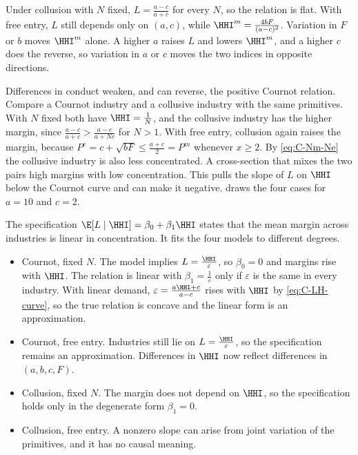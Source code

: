 Under collusion with $N$ fixed, $L = \frac{a - c}{a + c}$ for every $N$, so the relation is flat. With free
entry, $L$ still depends only on $(a, c)$, while $\HHI^m = \frac{4bF}{(a - c)^2}$. Variation in $F$ or $b$
moves $\HHI^m$ alone. A higher $a$ raises $L$ and lowers $\HHI^m$, and a higher $c$ does the reverse, so
variation in $a$ or $c$ moves the two indices in opposite directions.

Differences in conduct weaken, and can reverse, the positive Cournot relation. Compare a Cournot industry and
a collusive industry with the same primitives. With $N$ fixed both have $\HHI = \frac{1}{N}$, and the collusive
industry has the higher margin, since $\frac{a - c}{a + c} > \frac{a - c}{a + Nc}$ for $N > 1$. With free entry,
collusion again raises the margin, because $P^e = c + \sqrt{bF} \le \frac{a + c}{2} = P^m$ whenever $x \ge 2$.
By \eqref{eq:C-Nm-Ne} the collusive industry is also less concentrated. A cross-section that mixes the two
pairs high margins with low concentration. This pulls the slope of $L$ on $\HHI$ below the Cournot curve and
can make it negative.  draws the four cases for $a = 10$ and $c = 2$.

The specification $\E[L \mid \HHI] = \beta_0 + \beta_1\HHI$ states that the mean margin across industries is linear in
concentration. It fits the four models to different degrees.
\begin{itemize}
\item Cournot, fixed $N$. The model implies $L = \frac{\HHI}{\varepsilon}$, so $\beta_0 = 0$ and margins rise
  with $\HHI$. The relation is linear with $\beta_1 = \frac{1}{\varepsilon}$ only if $\varepsilon$ is the same in
  every industry. With linear demand, $\varepsilon = \frac{a\HHI + c}{a - c}$ rises with $\HHI$ by
  \eqref{eq:C-LH-curve}, so the true relation is concave and the linear form is an approximation.
\item Cournot, free entry. Industries still lie on $L = \frac{\HHI}{\varepsilon}$, so the specification remains
  an approximation. Differences in $\HHI$ now reflect differences in $(a, b, c, F)$.
\item Collusion, fixed $N$. The margin does not depend on $\HHI$, so the specification holds only in the
  degenerate form $\beta_1 = 0$.
\item Collusion, free entry. A nonzero slope can arise from joint variation of the primitives, and it has no
  causal meaning.
\end{itemize}


